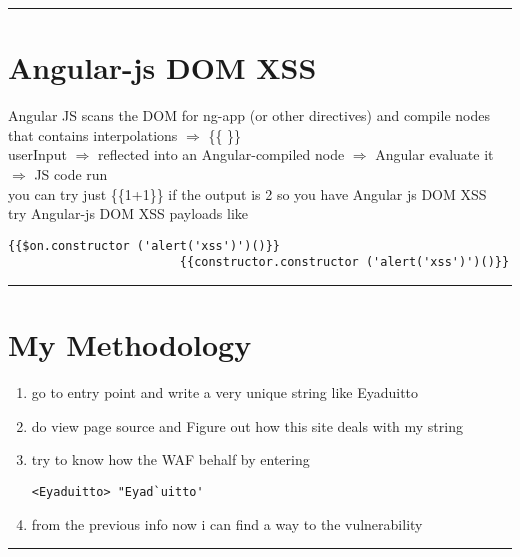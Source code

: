 \documentclass{article}
\begin{document}
\rule{15cm}{0.6pt}
      \section*{Angular-js DOM XSS}
      Angular JS scans the DOM for ng-app (or other directives) and compile nodes that contains interpolations  $\Longrightarrow$ \{\{ \}\}
      \\userInput $\Longrightarrow$ reflected into an Angular-compiled node $\Longrightarrow$ Angular evaluate it $\Longrightarrow$ JS code run
      \\ you can try just \{\{1+1\}\} if the output is 2 so you have Angular js DOM XSS
      \\try Angular-js DOM XSS payloads like
            \begin{lstlisting}[frame=single]
                        {{$on.constructor ('alert('xss')')()}}
                        {{constructor.constructor ('alert('xss')')()}}
            \end{lstlisting}

\rule{15cm}{0.6pt}
\section*{My Methodology}
\begin{enumerate}
    \item go to entry point and write a very unique string like Eyaduitto
    \item do view page source and Figure out how this site deals with my string
    \item try to know how the WAF behalf by entering
      \begin{lstlisting}[frame=single]
                        <Eyaduitto> "Eyad`uitto'
      \end{lstlisting}

    \item from the previous info now i can find a way to the vulnerability
\end{enumerate}

\rule{15cm}{0.6pt}
\end{document}
